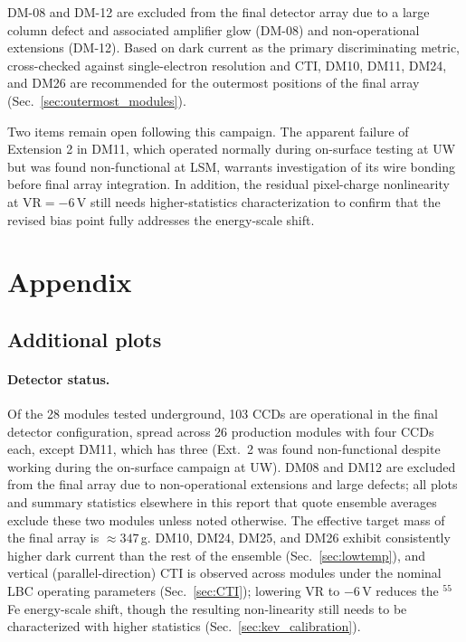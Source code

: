 \documentclass[11pt]{article}
\begin{document}
DM-08 and DM-12 are excluded from the final detector array due to a large column defect and associated amplifier glow (DM-08) and non-operational extensions (DM-12). Based on dark current as the primary discriminating metric, cross-checked against single-electron resolution and CTI, DM10, DM11, DM24, and DM26 are recommended for the outermost positions of the final array (Sec.~\ref{sec:outermost_modules}).

Two items remain open following this campaign. The apparent failure of Extension 2 in DM11, which operated normally during on-surface testing at UW but was found non-functional at LSM, warrants investigation of its wire bonding before final array integration. In addition, the residual pixel-charge nonlinearity at $\mathrm{VR}=-6$\,V still needs higher-statistics characterization to confirm that the revised bias point fully addresses the energy-scale shift.

\newpage
\appendix
\section{Appendix}
\label{sec:appendix}

\subsection{Additional plots}

\paragraph{Detector status.} Of the 28 modules tested underground, 103 CCDs are operational in the final detector configuration, spread across 26 production modules with four CCDs each, except DM11, which has three (Ext.\ 2 was found non-functional despite working during the on-surface campaign at UW). DM08 and DM12 are excluded from the final array due to non-operational extensions and large defects; all plots and summary statistics elsewhere in this report that quote ensemble averages exclude these two modules unless noted otherwise. The effective target mass of the final array is $\approx 347$\,g. DM10, DM24, DM25, and DM26 exhibit consistently higher dark current than the rest of the ensemble (Sec.~\ref{sec:lowtemp}), and vertical (parallel-direction) CTI is observed across modules under the nominal LBC operating parameters (Sec.~\ref{sec:CTI}); lowering $\mathrm{VR}$ to $-6$\,V reduces the $^{55}$Fe energy-scale shift, though the resulting non-linearity still needs to be characterized with higher statistics (Sec.~\ref{sec:kev_calibration}).
\end{document}
